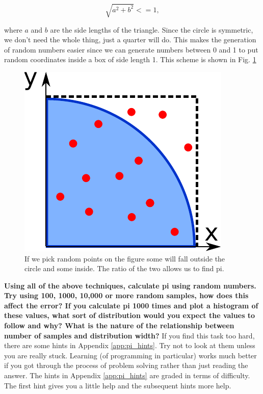	\begin{equation}
	\sqrt{a^2+b^2} <= 1,
	\end{equation}

	where $a$ and $b$ are the side lengths of the triangle. Since the circle is symmetric, we don't need the whole thing, just a quarter will do. This makes the generation of random numbers easier since we can generate numbers between 0 and 1 to put random coordinates inside a box of side length 1. This scheme is shown in Fig. \ref{fig:piarc}

	\begin{figure}[h]
		\centering
		\includegraphics[scale=0.6]{images/piarc}
		\caption{If we pick random points on the figure some will fall outside the circle and some inside. The ratio of the two allows us to find pi.}
		\label{fig:piarc}
	\end{figure}

	\textbf{Using all of the above techniques, calculate pi using random numbers. Try using 100, 1000, 10,000 or more random samples, how does this affect the error? If you calculate pi 1000 times and plot a histogram of these values, what sort of distribution would you expect the values to follow and why? What is the nature of the relationship between number of samples and distribution width?}
	If you find this task too hard, there are some hints in Appendix \ref{app:pi_hints}. Try not to look at them unless you are really stuck. Learning (of programming in particular) works much better if you got through the process of problem solving rather than just reading the answer. The hints in Appendix \ref{app:pi_hints} are graded in terms of difficulty. The first hint gives you a little help and the subsequent hints more help.